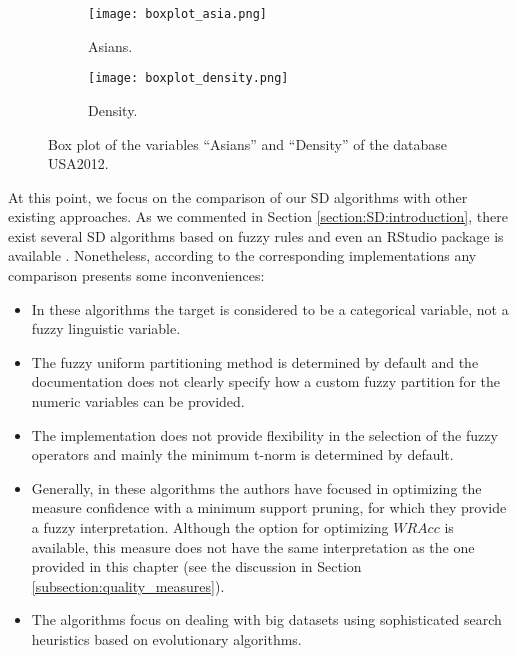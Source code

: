 \begin{figure}[ht]
	\centering
	\begin{subfigure}{.4\textwidth}
		\centering
		\texttt{[image: boxplot\_asia.png]}
		\caption{Asians.}
	\end{subfigure}\hspace{0.5cm}
	\begin{subfigure}{.4\textwidth}
		\centering
		\texttt{[image: boxplot\_density.png]}
		\caption{Density.}
	\end{subfigure}
	\caption{Box plot of the variables ``Asians'' and ``Density'' of the database USA2012.}
	\label{fig:boxplots}
\end{figure}

At this point, we focus on the comparison of our SD algorithms with other existing approaches. As we commented in Section \ref{section:SD:introduction}, there exist several SD algorithms based on fuzzy rules and even an RStudio package is available \cite{SDEFSR}. Nonetheless, according to the corresponding implementations any comparison presents some inconveniences:
\begin{itemize}
	\item In these algorithms the target is considered to be a categorical variable, not a fuzzy linguistic variable.
	\item The fuzzy uniform partitioning method is determined by default and the documentation does not clearly specify how a custom fuzzy partition for the numeric variables can be provided.
	\item The implementation does not provide flexibility in the selection of the fuzzy operators and mainly the minimum t-norm is determined by default.
	\item Generally, in these algorithms the authors have focused in optimizing the measure confidence with a minimum support pruning, for which they provide a fuzzy interpretation. Although the option for optimizing $WRAcc$ is available, this measure does not have the same interpretation as the one provided in this chapter (see the discussion in Section \ref{subsection:quality_measures}).
	\item The algorithms focus on dealing with big datasets using sophisticated search heuristics based on evolutionary algorithms.
\end{itemize}
